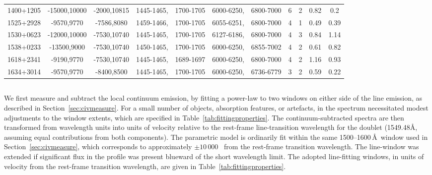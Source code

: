 \begin{table}
\begin{tabular}{ccccccccc}
    1400+1205 & -15000,10000 & -2000,10815 & 1445-1465,~~1700-1705 & 6000-6250,~~6800-7000 & 6 & 2 & 0.82 & 0.2 \\
    1525+2928 & -9570,9770 & -7586,8080 & 1459-1466,~~1700-1705 & 6055-6251,~~6800-7000 & 4 & 1 & 0.49 & 0.39 \\
    1530+0623 & -12000,10000 & -7530,10740 & 1445-1465,~~1700-1705 & 6127-6186,~~6800-7000 & 4 & 3 & 0.84 & 1.14 \\
    1538+0233 & -13500,9000 & -7530,10740 & 1450-1465,~~1700-1705 & 6000-6250,~~6855-7002 & 4 & 2 & 0.61 & 0.82 \\
    1618+2341 & -9190,9770 & -7530,10740 & 1445-1465,~~1689-1697 & 6000-6250,~~6800-7000 & 4 & 2 & 1.16 & 0.93 \\
    1634+3014 & -9570,9770 & -8400,8500 & 1445-1465,~~1700-1705 & 6000-6250,~~6736-6779 & 3 & 2 & 0.59 & 0.22 \\
    \hline
  \end{tabular}
\end{table}

\subsection{}

We first measure and subtract the local continuum emission, by fitting a power-law to two windows on either side of the line emission, as described in Section~\ref{sec:civmeasure}. 
For a small number of objects, absorption features, or artefacts, in the spectrum necessitated modest adjustments to the window extents, which are specified in Table~\ref{tab:fittingproperties}. 
The continuum-subtracted spectra are then transformed from wavelength units into units of velocity relative to the rest-frame line-transition wavelength for the  doublet (1549.48\AA, assuming equal contributions from both components). 
The parametric model is ordinarily fit within the same 1500--1600\,\AA \, window used in Section~\ref{sec:civmeasure}, which corresponds to approximately $\pm 10\,000$ \kms\, from the rest-frame transition wavelength. 
The line-window was extended if significant flux in the profile was present blueward of the short wavelength limit. 
The adopted line-fitting windows, in units of velocity from the rest-frame transition wavelength, are given in Table~\ref{tab:fittingproperties}. 

